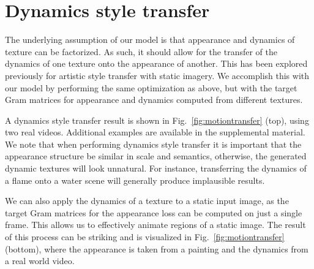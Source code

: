 



\section{Dynamics style transfer}

The underlying assumption of our model is that appearance
and dynamics of texture can be factorized.
As such, it should allow for the transfer of the dynamics of
one texture onto the appearance of another.
This has been explored previously for artistic style transfer
\cite{champandard2016,gatys2017} with static imagery.
We accomplish this with our model by performing the same 
optimization as above, but with the target Gram matrices for 
appearance and dynamics computed from different textures.

A dynamics style transfer result is shown in Fig.\ 
\ref{fig:motiontransfer} (top), using two real videos.
Additional examples are available in the supplemental material.
We note that when performing dynamics style transfer it is important
that the appearance structure be similar in scale and semantics,
otherwise, the generated dynamic textures will look unnatural.
For instance, transferring the dynamics of a flame onto a water 
scene will generally produce implausible results.

We can also apply the dynamics of a texture to a static input image,
as the target Gram matrices for the appearance loss can be computed
on just a single frame.
This allows us to effectively animate regions of a static image.
The result of this process can be striking and is visualized in
Fig.\ \ref{fig:motiontransfer} (bottom), where the appearance is 
taken from a painting and the dynamics from a real world video.

